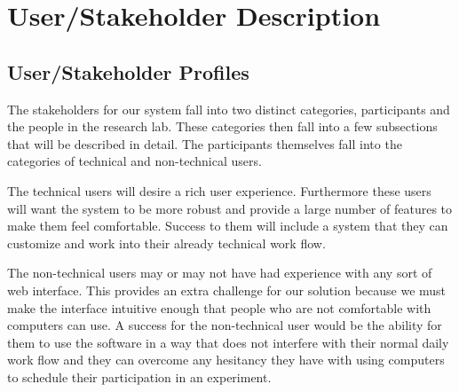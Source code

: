 \newcommand{\need}[6]{
\subsubsection{What is the need?}
\begin{table}[!h]
    \begin{tabular}{|l|p{12.25cm}|}
        \hline
        The problem of... & {#1} \\ \hline
        Affects... & {#2} \\ \hline
        And results in... & {#3} \\ \hline
        Benefits of a solution... & {#4} \\ \hline
    \end{tabular}
\end{table}
\subsubsection{How is it solved now?}
{#5}
\subsubsection{What is a possible solution?}
{#6}
}

\section{User/Stakeholder Description}
\subsection{User/Stakeholder Profiles}
The stakeholders for our system fall into two distinct categories, participants and the people in the research lab. These categories then fall into a few subsections that will be described in detail. The participants themselves fall into the categories of technical and non-technical users.

The technical users will desire a rich user experience. Furthermore these users will want the system to be more robust and provide a large number of features to make them feel comfortable. Success to them will include a system that they can customize and work into their already technical work flow.

The non-technical users may or may not have had experience with any sort of web interface. This provides an extra challenge for our solution because we must make the interface intuitive enough that people who are not comfortable with computers can use. A success for the non-technical user would be the ability for them to use the software in a way that does not interfere with their normal daily work flow and they can overcome any hesitancy they have with using computers to schedule their participation in an experiment.

